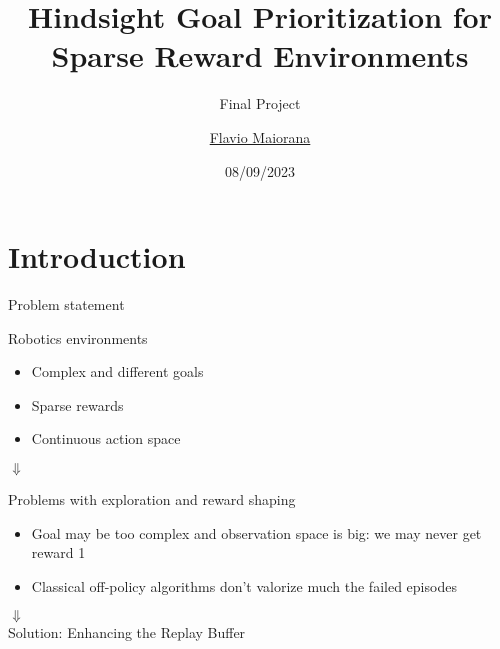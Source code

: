 \documentclass{beamer}
\title{Hindsight Goal Prioritization for Sparse Reward Environments}
\subtitle{Final Project}
\author{\href{mailto:maiorana.2051396@studenti.uniroma1.it}{Flavio Maiorana}}
\date{08/09/2023}
\begin{document}
\maketitle

\section{Introduction}

      \begin{frame}{Problem statement}
            \begin{block}{Robotics environments}
                  \begin{itemize}
                        \item Complex and different goals
                        \item Sparse rewards
                        \item Continuous action space
                  \end{itemize}  
            \end{block}

            $\Downarrow$ \centering \\

            \begin{block}{Problems with exploration and reward shaping}
                  \begin{itemize}
                        \item Goal may be too complex and observation space is big: we may never get reward 1
                        \item Classical off-policy algorithms don't valorize much the failed episodes
                  \end{itemize}  
            \end{block}

            $\Downarrow$ \centering \\

            Solution: Enhancing the Replay Buffer
      \end{frame}
\end{document}
